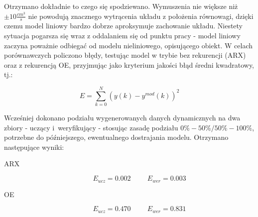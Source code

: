 Otrzymano dokładnie to czego się spodziewano. Wymuszenia nie większe niż $\pm 10 \frac{cm^3}{s}$ nie powodują znacznego wytrącenia układu z położenia równowagi, dzięki czemu model liniowy bardzo dobrze aproksymuje zachowanie układu. Niestety sytuacja pogarsza się wraz z oddalaniem się od punktu pracy - model liniowy zaczyna poważnie odbiegać od modelu nieliniowego, opisującego obiekt. W celach porównawczych policzono błędy, testując model w trybie bez rekurencji (ARX) oraz z rekurencją OE, przyjmując jako kryterium jakości błąd średni kwadratowy, tj.:

\begin{equation}
E = \sum_{k=0}^N (y(k) - y^{mod}(k))^2
\end{equation}

\noindent Wcześniej dokonano podziału wygenerowanych danych dynamicznych na dwa zbiory - uczący i~weryfikujący - stosując zasadę podziału $0\% - 50\% / 50\% - 100\%$, potrzebne do późniejszego, ewentualnego dostrajania modelu. Otrzymano następujące wyniki:

\begin{description}
\item[ARX] 
\begin{equation}
E_{ucz} = \num{0.002} \hspace{1cm} E_{wer}=\num{0.003}
\end{equation}
\item[OE] 
\begin{equation}
E_{ucz} = \num{0.470} \hspace{1cm} E_{wer}=\num{0.831}
\end{equation}
\end{description}


